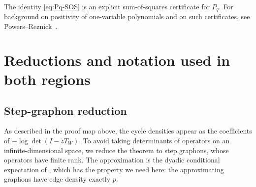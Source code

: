 \documentclass[11pt]{article}
\newtheorem{remark}[theorem]{Remark}
\numberwithin{equation}{section}
\newcommand{\ip}[2]{\left\langle #1,#2\right\rangle}
\newcommand{\norm}[1]{\left\lVert #1\right\rVert}
\newcommand{\dd}{\,\mathrm d}
\begin{document}
The identity \eqref{eq:Pq-SOS} is an explicit sum-of-squares certificate for
$P_q$.  For background on positivity of one-variable polynomials and on such
certificates, see Powers--Reznick~\cite{PowersReznick2000}.

\section{Reductions and notation used in both regions}\label{sec:common-operator}

\subsection{Step-graphon reduction}\label{subsec:step-reduction}

As described in the proof map above, the cycle densities appear as the
coefficients of $-\log\det(I-zT_W)$.  To avoid taking determinants of
operators on an infinite-dimensional space, we reduce the theorem to step
graphons, whose operators have finite rank.  The approximation is the
dyadic conditional expectation of \cite[Appendix~A.3.6]{Lovasz2012}, which
has the property we need here: the approximating graphons have edge density
exactly $p$.
\end{document}
